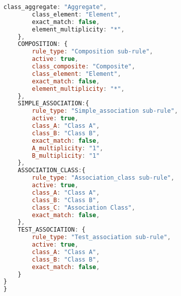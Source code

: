 \begin{lstlisting}[caption={Rules Definition JSON}, label={lst:rules_def}, language=javascript]
        class_aggregate: "Aggregate",
        class_element: "Element",
        exact_match: false,
        element_multiplicity: "*",
    },
    COMPOSITION: {
        rule_type: "Composition sub-rule",
        active: true,
        class_composite: "Composite",
        class_element: "Element",
        exact_match: false,
        element_multiplicity: "*",
    },
    SIMPLE_ASSOCIATION:{
        rule_type: "Simple_association sub-rule",
        active: true,
        class_A: "Class A",
        class_B: "Class B",
        exact_match: false,
        A_multiplicity: "1",
        B_multiplicity: "1"
    },
    ASSOCIATION_CLASS:{
        rule_type: "Association_class sub-rule",
        active: true,
        class_A: "Class A",
        class_B: "Class B",
        class_C: "Association Class",
        exact_match: false,
    },
    TEST_ASSOCIATION: {
        rule_type: "Test_association sub-rule",
        active: true,
        class_A: "Class A",
        class_B: "Class B",
        exact_match: false,
    }
}
}
\end{lstlisting}


\newpage
